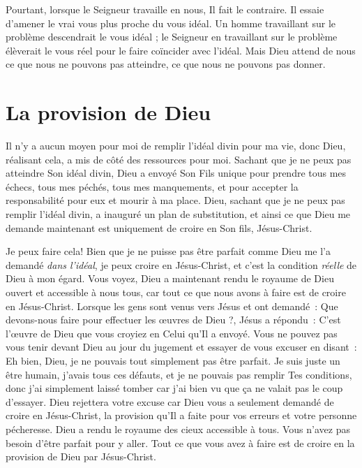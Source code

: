 Pourtant, lorsque le Seigneur travaille en nous, Il fait le contraire.
 Il essaie d'amener le vrai vous plus proche du vous idéal.
 Un homme travaillant sur le problème descendrait le vous idéal ;
 le Seigneur en travaillant sur le problème élèverait le vous réel
 pour le faire coïncider avec l'idéal.
 Mais Dieu attend de nous ce que nous ne pouvons pas atteindre,
 ce que nous ne pouvons pas donner.


\section{La provision de Dieu}

Il n'y a aucun moyen pour moi de remplir l'idéal divin
 pour ma vie, donc Dieu, réalisant cela, a mis de côté
 des ressources pour moi.
 Sachant que je ne peux pas atteindre Son idéal divin,
 Dieu a envoyé Son Fils unique pour prendre tous mes échecs,
 tous mes péchés, tous mes manquements, et pour accepter la responsabilité
 pour eux et mourir à ma place.
 Dieu, sachant que je ne peux pas remplir l'idéal divin,
 a inauguré un plan de substitution, et ainsi ce que Dieu
 me demande maintenant est uniquement de croire en Son fils, Jésus-Christ.

Je peux faire cela!
 Bien que je ne puisse pas être parfait
 comme Dieu me l'a demandé \emph{dans l'idéal},
 je peux croire en Jésus-Christ,
 et c'est la condition \emph{réelle} de Dieu à mon égard.
 Vous voyez, Dieu a maintenant rendu le royaume de Dieu ouvert
 et accessible à nous tous, car tout ce que nous avons à faire
 est de croire en Jésus-Christ.
 Lorsque les gens sont venus vers Jésus et ont demandé~:
 \og Que devons-nous faire pour effectuer les œuvres de Dieu ?\fg{},
 Jésus a répondu~:
 \og C'est l'œuvre de Dieu que vous croyiez en Celui qu'Il a envoyé. \fg{}
 Vous ne pouvez pas vous tenir devant Dieu au jour du jugement
 et essayer de vous excuser en disant~:
 \og Eh bien, Dieu, je ne pouvais tout simplement pas être parfait.
 Je suis juste un être humain, j'avais tous ces défauts,
 et je ne pouvais pas remplir Tes conditions,
 donc j'ai simplement laissé tomber car j'ai bien vu
 que ça ne valait pas le coup d'essayer. \fg{}
 Dieu rejettera votre excuse car Dieu vous a seulement demandé
 de croire en Jésus-Christ, la provision qu'Il a faite pour vos erreurs
 et votre personne pécheresse.
 Dieu a rendu le royaume des cieux accessible à tous.
 Vous n'avez pas besoin d'être parfait pour y aller.
 Tout ce que vous avez à faire est de croire en la provision
 de Dieu par Jésus-Christ.

